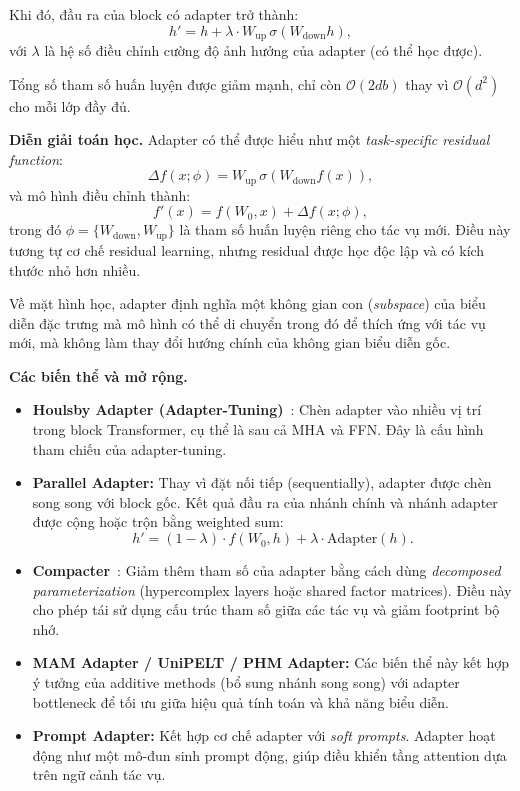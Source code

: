 Khi đó, đầu ra của block có adapter trở thành:
\[
h' = h + \lambda \cdot W_{\text{up}} \, \sigma(W_{\text{down}} h),
\]
với $\lambda$ là hệ số điều chỉnh cường độ ảnh hưởng của adapter (có thể học được).  

Tổng số tham số huấn luyện được giảm mạnh, chỉ còn $\mathcal{O}(2db)$ thay vì $\mathcal{O}(d^2)$ cho mỗi lớp đầy đủ.

\textbf{Diễn giải toán học.}  
Adapter có thể được hiểu như một \textit{task-specific residual function}:
\[
\Delta f(x; \phi) = W_{\text{up}} \, \sigma(W_{\text{down}} f(x)),
\]
và mô hình điều chỉnh thành:
\[
f'(x) = f(W_0, x) + \Delta f(x; \phi),
\]
trong đó $\phi = \{W_{\text{down}}, W_{\text{up}}\}$ là tham số huấn luyện riêng cho tác vụ mới.  
Điều này tương tự cơ chế residual learning, nhưng residual được học độc lập và có kích thước nhỏ hơn nhiều.  

Về mặt hình học, adapter định nghĩa một không gian con (\textit{subspace}) của biểu diễn đặc trưng mà mô hình có thể di chuyển trong đó để thích ứng với tác vụ mới, mà không làm thay đổi hướng chính của không gian biểu diễn gốc.

\textbf{Các biến thể và mở rộng.}
\begin{itemize}
	\item \textbf{Houlsby Adapter (Adapter-Tuning)}~\cite{houlsby2019parameter}:  
	Chèn adapter vào nhiều vị trí trong block Transformer, cụ thể là sau cả MHA và FFN.
	Đây là cấu hình tham chiếu của adapter-tuning.
	
	\item \textbf{Parallel Adapter:}  
	Thay vì đặt nối tiếp (sequentially), adapter được chèn song song với block gốc.  
	Kết quả đầu ra của nhánh chính và nhánh adapter được cộng hoặc trộn bằng weighted sum:
	\[
	h' = (1-\lambda) \cdot f(W_0, h) + \lambda \cdot \text{Adapter}(h).
	\]
	
	\item \textbf{Compacter}~\cite{mahabadi2021compacter}:  
	Giảm thêm tham số của adapter bằng cách dùng \textit{decomposed parameterization} (hypercomplex layers hoặc shared factor matrices).  
	Điều này cho phép tái sử dụng cấu trúc tham số giữa các tác vụ và giảm footprint bộ nhớ.
	
	\item \textbf{MAM Adapter\cite{he2022towards} / UniPELT\cite{ma2022unipelt} / PHM Adapter\cite{zhang2021phm}:}  
	Các biến thể này kết hợp ý tưởng của additive methods (bổ sung nhánh song song) với adapter bottleneck để tối ưu giữa hiệu quả tính toán và khả năng biểu diễn.
	
	\item \textbf{Prompt Adapter:}  
	Kết hợp cơ chế adapter với \textit{soft prompts}. Adapter hoạt động như một mô-đun sinh prompt động, giúp điều khiển tầng attention dựa trên ngữ cảnh tác vụ.
\end{itemize}

